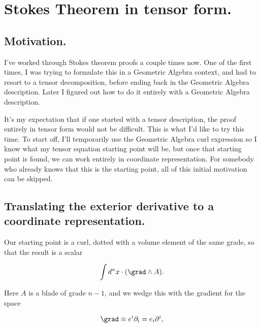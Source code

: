 
%

\chapter{Stokes Theorem in tensor form.}
\label{chap:stokesTensor}
{}
\date{Feb 20, 2011}

\beginArtWithToc

\section{Motivation.}

I've worked through Stokes theorem proofs a couple times now.  One of the first times, I was trying to formulate this in a Geometric Algebra context, and had to resort to a tensor decomposition, before ending back in the Geometric Algebra description.  Later I figured out how to do it entirely with a Geometric Algebra description.

It's my expectation that if one started with a tensor description, the proof entirely in tensor form would not be difficult.  This is what I'd like to try this time.  To start off, I'll temporarily use the Geometric Algebra curl expression so I know what my tensor equation starting point will be, but once that starting point is found, we can work entirely in coordinate representation.  For somebody who already knows that this is the starting point, all of this initial motivation can be skipped.

\section{Translating the exterior derivative to a coordinate representation.}

Our starting point is a curl, dotted with a volume element of the same grade, so that the result is a scalar

\begin{equation}\label{eqn:stokesTensor:n}
\int d^n x \cdot (\grad \wedge A).
\end{equation}

Here $A$ is a blade of grade $n-1$, and we wedge this with the gradient for the space

\begin{equation}\label{eqn:stokesTensor:n}
\grad \equiv e^i \partial_i = e_i \partial^i,
\end{equation}

